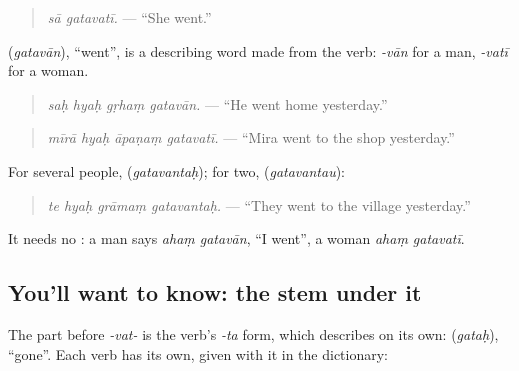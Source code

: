 \begin{quote}
\textbf{ }
\end{quote}

\begin{quote}
\emph{sā gatavatī.} — \textquotedblleft{}She went.\textquotedblright{}
\end{quote}

\textbf{} (\emph{gatavān}), \textquotedblleft{}went\textquotedblright{}, is a describing word made from the verb: \emph{-vān} for a man, \emph{-vatī} for a woman.

\begin{quote}
\textbf{   }
\end{quote}

\begin{quote}
\emph{saḥ hyaḥ gṛhaṃ gatavān.} — \textquotedblleft{}He went home yesterday.\textquotedblright{}
\end{quote}

\begin{quote}
\textbf{   }
\end{quote}

\begin{quote}
\emph{mīrā hyaḥ āpaṇaṃ gatavatī.} — \textquotedblleft{}Mira went to the shop yesterday.\textquotedblright{}
\end{quote}

For several people, \textbf{} (\emph{gatavantaḥ}); for two, \textbf{} (\emph{gatavantau}):

\begin{quote}
\textbf{   }
\end{quote}

\begin{quote}
\emph{te hyaḥ grāmaṃ gatavantaḥ.} — \textquotedblleft{}They went to the village yesterday.\textquotedblright{}
\end{quote}

It needs no \textbf{}: a man says \emph{ahaṃ gatavān}, \textquotedblleft{}I went\textquotedblright{}, a woman \emph{ahaṃ gatavatī}.

\subsection*{You'll want to know: the stem under it}
The part before \emph{-vat-} is the verb's \emph{-ta} form, which describes on its own: \textbf{} (\emph{gataḥ}), \textquotedblleft{}gone\textquotedblright{}. Each verb has its own, given with it in the dictionary:

